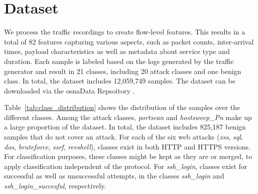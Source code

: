 \section{Dataset}
We process the traffic recordings to create flow-level features. This results in a total of 82 features capturing various aspects, such as packet counts, inter-arrival times, payload characteristics as well as metadata about service type and duration. Each sample is labeled based on the logs generated by the traffic generator and result in 21 classes, including 20 attack classes and one benign class. In total, the dataset includes 12,059,749 samples. The dataset can be downloaded via the osnaData Repsoitory \cite{FK2/MOCIY8_2025}.

Table~\ref{tab:class_distribution} shows the distribution of the samples over the different classes. Among the attack classes, \emph{portscan} and \emph{hostsweep\_Pn} make up a large proportion of the dataset. In total, the dataset includes 825,187 benign samples that do not cover an attack. For each of the six web attacks (\emph{xss}, \emph{sql}, \emph{dos}, \emph{bruteforce}, \emph{ssrf}, \emph{revshell}), classes exist in both HTTP and HTTPS versions. For classification purposes, these classes might be kept as they are or merged, to apply classification independent of the protocol. For \emph{ssh\_login}, classes exist for successful as well as unsuccessful attempts, in the classes \emph{ssh\_login} and \emph{ssh\_login\_succesful}, respectively.

